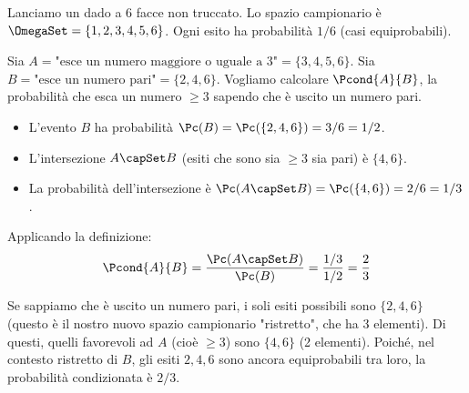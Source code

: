 \begin{example}
Lanciamo un dado a 6 facce non truccato.
Lo spazio campionario è $\OmegaSet = \{1, 2, 3, 4, 5, 6\}$. Ogni esito ha probabilità $1/6$ (casi equiprobabili).

Sia $A = \text{"esce un numero maggiore o uguale a 3"} = \{3, 4, 5, 6\}$.
Sia $B = \text{"esce un numero pari"} = \{2, 4, 6\}$.
Vogliamo calcolare $\Pcond{A}{B}$, la probabilità che esca un numero $\ge 3$ sapendo che è uscito un numero pari.

\begin{itemize}
    \item L'evento $B$ ha probabilità $\Pc(B) = \Pc(\{2, 4, 6\}) = 3/6 = 1/2$.
    \item L'intersezione $A \capSet B$ (esiti che sono sia $\ge 3$ sia pari) è $\{4, 6\}$.
    \item La probabilità dell'intersezione è $\Pc(A \capSet B) = \Pc(\{4, 6\}) = 2/6 = 1/3$.
\end{itemize}
Applicando la definizione:
\[ \Pcond{A}{B} = \frac{\Pc(A \capSet B)}{\Pc(B)} = \frac{1/3}{1/2} = \frac{2}{3} \]
\begin{remark}
Se sappiamo che è uscito un numero pari, i soli esiti possibili sono $\{2, 4, 6\}$ (questo è il nostro nuovo spazio campionario "ristretto", che ha 3 elementi). Di questi, quelli favorevoli ad $A$ (cioè $\ge 3$) sono $\{4, 6\}$ (2 elementi). Poiché, nel contesto ristretto di $B$, gli esiti $2, 4, 6$ sono ancora equiprobabili tra loro, la probabilità condizionata è $2/3$.
\end{remark}
\end{example}

